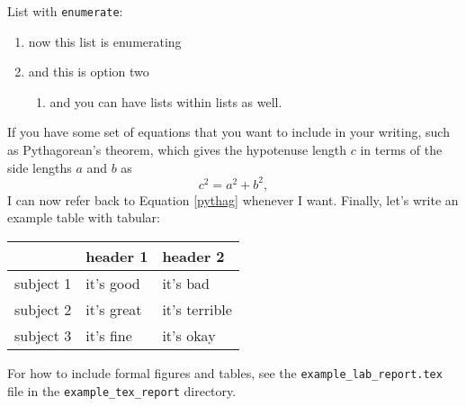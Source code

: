 \documentclass{article}
\begin{document}
List with \texttt{enumerate}:
\begin{enumerate}

    \item now this list is enumerating
    \item and this is option two
        \begin{enumerate}
            \item and you can have lists within lists as well.
        \end{enumerate}
\end{enumerate}

If you have some set of equations that you want to include in your writing,
such as Pythagorean's theorem, which gives the hypotenuse length $c$ in terms
of the side lengths $a$ and $b$ as
\begin{equation}
    c^2 = a^2 + b^2,
\label{pythag} \end{equation}
I can now refer back to Equation \ref{pythag} whenever I want. Finally, let's
write an example table with tabular:
\begin{center}
\begin{tabular}{r|l l} %
              & header 1 & header 2 \\ \hline
    subject 1 & it's good  & it's bad \\
    subject 2 & it's great & it's terrible \\
    subject 3 & it's fine  & it's okay
\end{tabular}
\end{center}

For how to include formal figures and tables, see the \texttt{example\_lab\_report.tex} file in
the \texttt{example\_tex\_report} directory.
\end{document}

